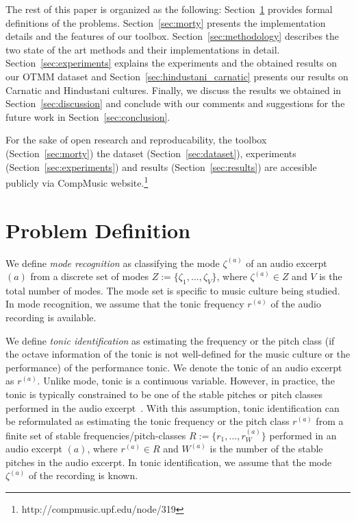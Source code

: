 \documentclass{sig-alternate}
\begin{document}
The rest of this paper is organized as the following: Section~\ref{sec:problem} provides formal definitions of the problems. Section~\ref{sec:morty} presents the implementation details and the features of our toolbox. Section~\ref{sec:methodology} describes the two state of the art methods and their implementations in detail. Section~\ref{sec:experiments} explains the experiments and the obtained results on our OTMM dataset and Section~\ref{sec:hindustani_carnatic} presents our results on Carnatic and Hindustani cultures. Finally, we discuss the results we obtained in Section~\ref{sec:discussion} and conclude with our comments and suggestions for the future work in Section~\ref{sec:conclusion}.

For the sake of open research and reproducability, the toolbox (Section~\ref{sec:morty}) the dataset (Section~\ref{sec:dataset}), experiments (Section~\ref{sec:experiments}) and results (Section~\ref{sec:results}) are accesible publicly via CompMusic website.\footnote{http://compmusic.upf.edu/node/319}

\section{Problem Definition}\label{sec:problem}
We define \emph{mode recognition} as classifying the mode $\zeta^{(a)}$ of an audio excerpt $(a)$ from a discrete set of modes $Z := \{\zeta_1, \dots, \zeta_V\}$, where $\zeta^{(a)} \in Z$ and $V$ is the total number of modes. The mode set is specific to music culture being studied. In mode recognition, we assume that the tonic frequency $r^{(a)}$ of the audio recording is available.

We define \emph{tonic identification} as estimating the frequency or the pitch class (if the octave information of the tonic is not well-defined for the music culture or the performance) of the performance tonic. We denote the tonic of an audio excerpt as $r^{(a)}$. Unlike mode, tonic is a continuous variable. However, in practice, the tonic is typically constrained to be one of the stable pitches or pitch classes performed in the audio excerpt~\cite{chordia,bozkurt_makam}. With this assumption, tonic identification can be reformulated as estimating the tonic frequency or the pitch class $r^{(a)}$ from a finite set of stable frequencies/pitch-classes $R := \{r_1, \dots, r_W^{(a)}\}$ performed in an audio excerpt $(a)$, where $r^{(a)} \in R$ and $W^{(a)}$ is the number of the stable pitches in the audio excerpt. In tonic identification, we assume that the mode $\zeta^{(a)}$ of the recording is known. 
\end{document}
